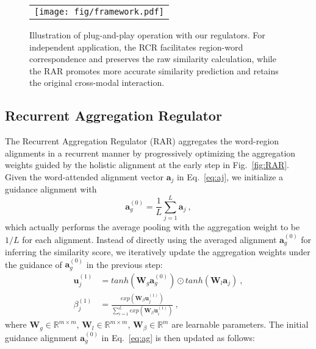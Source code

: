 \documentclass[journal]{IEEEtran}\newcommand{\ignore}[1]{}
\begin{document}
\begin{figure*}[t!]
	\centering
	\begin{tabular}{@{}c}
		\texttt{[image: fig/framework.pdf]} 
	\end{tabular}
	\caption{Illustration of plug-and-play operation with our regulators. For independent application, the RCR facilitates region-word correspondence and preserves the raw similarity calculation, while the RAR promotes more accurate similarity prediction and retains the original cross-modal interaction.}
	\label{fig:framework}
\end{figure*}

\subsection{Recurrent Aggregation Regulator}
The Recurrent Aggregation Regulator (RAR) aggregates the word-region alignments in a recurrent manner by progressively optimizing the aggregation weights guided by the holistic alignment at the early step in Fig.~\ref{fig:RAR}.
Given the word-attended alignment vector $\boldsymbol{a}_{j}$ in Eq.~\eqref{eq:aj}, we initialize a guidance alignment with
\begin{equation}
\label{eq:ag}
    \boldsymbol{a}_{g}^{(0)} = \frac{1}{L} \sum_{j=1}^{L} \boldsymbol{a}_{j} \ ,
\end{equation}
which actually performs the average pooling with the aggregation weight to be $1/L$ for each alignment.
Instead of directly using the averaged alignment $\boldsymbol{a}_{g}^{(0)}$ for inferring the similarity score, we iteratively update the aggregation weights under the guidance of $\boldsymbol{a}_{g}^{(0)}$ in the previous step:
\begin{equation}
\label{eq:betaj}
 \begin{split}
    \boldsymbol{u}_{j}^{(1)} &= tanh(\boldsymbol{W}_{g}\boldsymbol{a}_{g}^{(0)})\odot tanh(\boldsymbol{W}_{l}\boldsymbol{a}_{j}) \ , \\
    {\beta}_{j}^{(1)} &= \frac{exp(\boldsymbol{W}_{\beta}\boldsymbol{u}_{j}^{(1)})}{\sum_{i=1}^{L} exp(\boldsymbol{W}_{\beta}\boldsymbol{u}_{i}^{(1)})} \ ,
\end{split}
\end{equation}
where $\boldsymbol{W}_{g} \in \mathbb{R}^{m \times m}$, $\boldsymbol{W}_{l} \in \mathbb{R}^{m \times m}$, $\boldsymbol{W}_{\beta} \in \mathbb{R}^{m}$ are learnable parameters. The initial guidance alignment $\boldsymbol{a}_{g}^{(0)}$ in Eq.~\eqref{eq:ag} is then updated as follows:
\end{document}
